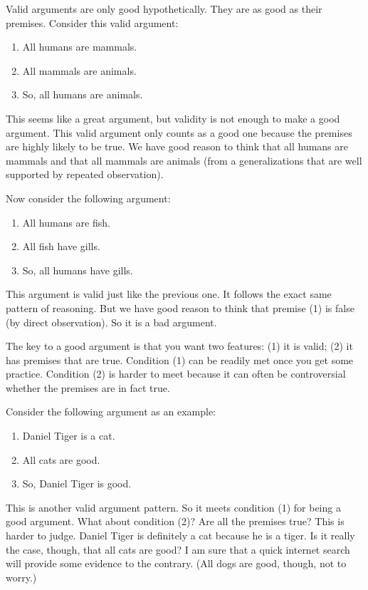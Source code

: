 \documentclass[oneside,letterpaper,12pt]{book}
\begin{document}
Valid arguments are only good hypothetically. They are as good as their premises. Consider this valid argument:
\begin{enumerate}
	\item All humans are mammals.
	\item All mammals are animals.
	\item So, all humans are animals.
\end{enumerate}
This seems like a great argument, but validity is not enough to make a good argument. This valid argument only counts as a good one because the premises are highly likely to be true. We have good reason to think that all humans are mammals and that all mammals are animals (from a generalizations that are well supported by repeated observation).

Now consider the following argument:
\begin{enumerate}
	\item All humans are fish.
	\item All fish have gills.
	\item So, all humans have gills.
\end{enumerate}
This argument is valid just like the previous one. It follows the exact same pattern of reasoning. But we have good reason to think that premise (1) is false (by direct observation). So it is a bad argument.

The key to a good argument is that you want two features: (1) it is valid; (2) it has premises that are true. Condition (1) can be readily met once you get some practice. Condition (2) is harder to meet because it can often be controversial whether the premises are in fact true.

Consider the following argument as an example:
\begin{enumerate}
	\item Daniel Tiger is a cat.
	\item All cats are good.
	\item So, Daniel Tiger is good.
\end{enumerate}
This is another valid argument pattern. So it meets condition (1) for being a good argument. What about condition (2)? Are all the premises true? This is harder to judge. Daniel Tiger is definitely a cat because he is a tiger. Is it really the case, though, that all cats are good? I am sure that a quick internet search will provide some evidence to the contrary. (All dogs are good, though, not to worry.)
\end{document}
